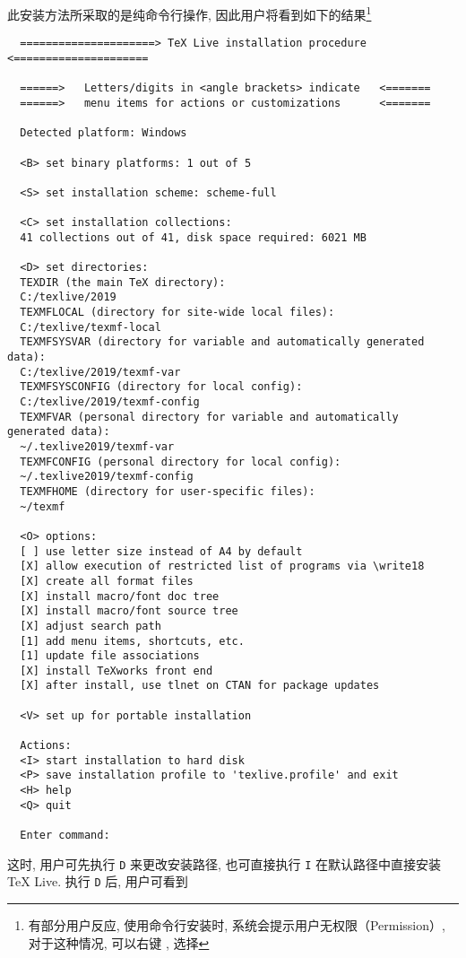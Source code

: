 \documentclass{ctexrep}
\begin{document}
此安装方法所采取的是纯命令行操作, 因此用户将看到如下的结果\footnote{有部分用户反应, 使用命令行安装时, 系统会提示用户无权限（Permission）, 对于这种情况, 可以右键 , 选择 }
\begin{lstlisting}
  =====================> TeX Live installation procedure <=====================
  
  ======>   Letters/digits in <angle brackets> indicate   <=======
  ======>   menu items for actions or customizations      <=======
  
  Detected platform: Windows
  
  <B> set binary platforms: 1 out of 5
  
  <S> set installation scheme: scheme-full
  
  <C> set installation collections:
  41 collections out of 41, disk space required: 6021 MB
  
  <D> set directories:
  TEXDIR (the main TeX directory):
  C:/texlive/2019
  TEXMFLOCAL (directory for site-wide local files):
  C:/texlive/texmf-local
  TEXMFSYSVAR (directory for variable and automatically generated data):
  C:/texlive/2019/texmf-var
  TEXMFSYSCONFIG (directory for local config):
  C:/texlive/2019/texmf-config
  TEXMFVAR (personal directory for variable and automatically generated data):
  ~/.texlive2019/texmf-var
  TEXMFCONFIG (personal directory for local config):
  ~/.texlive2019/texmf-config
  TEXMFHOME (directory for user-specific files):
  ~/texmf
  
  <O> options:
  [ ] use letter size instead of A4 by default
  [X] allow execution of restricted list of programs via \write18
  [X] create all format files
  [X] install macro/font doc tree
  [X] install macro/font source tree
  [X] adjust search path
  [1] add menu items, shortcuts, etc.
  [1] update file associations
  [X] install TeXworks front end
  [X] after install, use tlnet on CTAN for package updates
  
  <V> set up for portable installation
  
  Actions:
  <I> start installation to hard disk
  <P> save installation profile to 'texlive.profile' and exit
  <H> help
  <Q> quit
  
  Enter command:
\end{lstlisting}
这时, 用户可先执行 \texttt{D} 来更改安装路径, 也可直接执行 \texttt{I} 在默认路径中直接安装 \TeX{} Live. 
执行 \texttt{D} 后, 用户可看到
\end{document}
